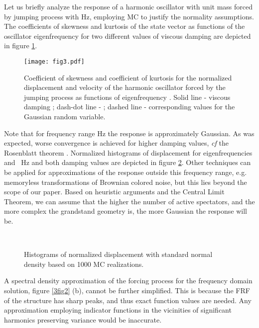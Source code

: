 \documentclass[preprint,12pt,authoryear]{elsarticle}
\begin{document}
Let us briefly analyze the response of a harmonic oscillator with unit mass forced by jumping process  with  Hz, employing MC to justify the normality assumptions. The coefficients of skewness and kurtosis of the state vector  as functions of the oscillator eigenfrequency  for two different values of viscous damping  are depicted in figure \ref{3fig3}.
\begin{figure}
	\centering
  \texttt{[image: fig3.pdf]}
	\caption{Coefficient of skewness  and coefficient of kurtosis  for the normalized displacement and velocity of the harmonic oscillator forced by the jumping process as functions of eigenfrequency . Solid line - viscous damping ; dash-dot line - ; dashed line - corresponding values for the Gaussian random variable.}
	\label{3fig3}
\end{figure}
Note that for frequency range  Hz the response is approximately Gaussian. As was expected, worse convergence is achieved for higher damping values, \textit{cf} the Rosenblatt theorem \citep{Grigoriu_nong}. Normalized histograms of displacement for eigenfrequencies  and ~Hz and both damping values are depicted in figure \ref{3fig4}. Other techniques can be applied for approximations of the response outside this frequency range, e.g. memoryless transformations of Brownian colored noise, but this lies beyond the scope of our paper. Based on heuristic arguments and the Central Limit Theorem, we can assume that the higher the number of active spectators, and the more complex the grandstand geometry is, the more Gaussian the response will be.

\begin{figure}
	\centering
  \\
	\caption{Histograms of normalized displacement  with standard normal density based on 1000 MC realizations.}
	\label{3fig4}
\end{figure}


A spectral density approximation of the forcing process for the frequency domain solution, figure \ref{3fig2} (b), cannot be further simplified. This is because the FRF of the structure has sharp peaks, and thus exact function values are needed. Any approximation employing indicator functions in the vicinities of significant harmonics preserving variance would be inaccurate.
\end{document}
